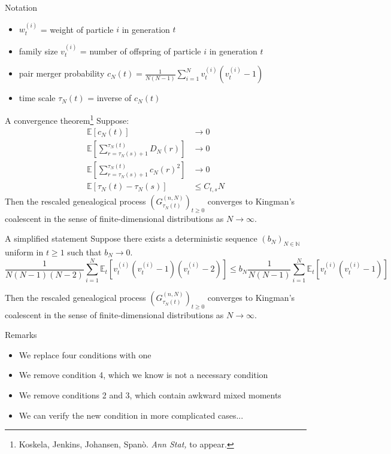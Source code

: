\documentclass[aspectratio=169]{beamer}
\theoremstyle{definition}
\newcommand{\E}{\mathbb{E}}
\newcommand{\vt}[2][t]{v_{#1}^{(#2)}}
\newcommand{\wt}[2][t]{w_{#1}^{(#2)}}
\newcommand{\Et}{\mathbb{E}_{t}}
\begin{document}
\begin{frame}{Notation}
\begin{itemize}
\item $\wt{i}$ = weight of particle $i$ in generation $t$
\item family size $\vt{i}$ = number of offspring of particle $i$ in generation $t$
\pause
\item pair merger probability $c_N(t) = \frac{1}{N(N-1)}\sum_{i=1}^N \vt{i}(\vt{i}-1)$
\pause
\item time scale $\tau_N(t)$ = inverse of $c_N(t)$
\end{itemize}
\end{frame}

\begin{frame}{A convergence theorem\footnote{Koskela, Jenkins, Johansen, Span\`o. \textit{Ann Stat,} to appear.}}
\vspace{-10pt}
Suppose:
\begin{align*}
\E [c_N(t)] &\rightarrow 0  \\
\E \left[ \sum_{ r = \tau_N( s ) + 1 }^{ \tau_N( t ) } D_N( r ) \right] &\rightarrow 0 \\
\E \left[ \sum_{ r = \tau_N( s ) + 1 }^{ \tau_N( t ) } c_N( r )^2 \right] &\rightarrow 0 \\
\E [\tau_N(t) - \tau_N(s)] &\leq C_{t,s} N 
\end{align*}
Then the rescaled genealogical process $(G_{\tau_N(t)}^{(n,N)})_{t\geq0} $ converges to Kingman's coalescent in the sense of finite-dimensional distributions as $N\to\infty$.
\end{frame}

\begin{frame}{A simplified statement}
\vspace{-10pt}
\pause
Suppose there exists a deterministic sequence $(b_N)_{N\in\mathbb{N}}$ uniform in $t\geq 1$ such that $b_N \to 0$.
\begin{equation*}
\frac{1}{N(N-1)(N-2)} \sum_{i = 1}^N \Et[ \vt{i}(\vt{i}-1)(\vt{i}-2) ]  \leq b_N \frac{1}{N(N-1)} \sum_{i = 1}^N \Et[ \vt{i}(\vt{i}-1)  ]
\end{equation*}

Then the rescaled genealogical process $(G_{\tau_N(t)}^{(n,N)})_{t\geq0} $ converges to Kingman's coalescent in the sense of finite-dimensional distributions as $N\to\infty$.
\end{frame}

\begin{frame}{Remarks}
\begin{itemize}
\item We replace four conditions with one
\pause
\item We remove condition 4, which we know is not a necessary condition
\pause
\item We remove conditions 2 and 3, which contain awkward mixed moments
\pause
\item We can verify the new condition in more complicated cases...
\end{itemize}
\end{frame}
\end{document}
